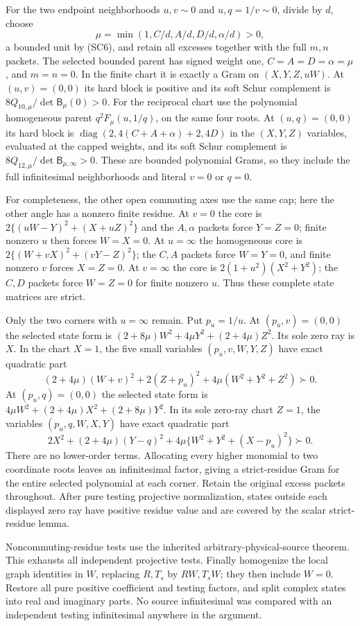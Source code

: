 For the two endpoint neighborhoods $u,v\sim0$ and
$u,q=1/v\sim0$, divide by $d$, choose
\[
 \mu=\min(1,C/d,A/d,D/d,\alpha/d)>0,
\]
a bounded unit by (SC6), and retain all excesses together with
the full $m,n$ packets. The selected bounded parent has signed
weight one, $C=A=D=\alpha=\mu$, and $m=n=0$.
In the finite chart it is exactly a Gram on $(X,Y,Z,uW)$.
At $(u,v)=(0,0)$ its hard block is positive and its soft Schur
complement is $8Q_{10,\mu}/\det\mathsf B_\mu(0)>0$.
For the reciprocal chart use the polynomial homogeneous parent
$q^2F_\mu(u,1/q)$, on the same four roots. At $(u,q)=(0,0)$
its hard block is
$\operatorname{diag}(2,4(C+A+\alpha)+2,4D)$ in the
$(X,Y,Z)$ variables, evaluated at the capped weights, and its
soft Schur complement is
$8Q_{12,\mu}/\det\mathsf B_{\mu,\infty}>0$.
These are bounded polynomial Grams, so they include the full
infinitesimal neighborhoods and literal $v=0$ or $q=0$.

For completeness, the other open commuting axes use the same cap;
here the other angle has a nonzero finite residue.
At $v=0$ the core is $2\{(uW-Y)^2+(X+uZ)^2\}$ and the
$A,\alpha$ packets force $Y=Z=0$; finite nonzero $u$ then forces
$W=X=0$. At $u=\infty$ the homogeneous core is
$2\{(W+vX)^2+(vY-Z)^2\}$; the $C,A$ packets force $W=Y=0$,
and finite nonzero $v$ forces $X=Z=0$. At $v=\infty$ the core
is $2(1+u^2)(X^2+Y^2)$; the $C,D$ packets force $W=Z=0$
for finite nonzero $u$. Thus these complete state matrices are strict.

Only the two corners with $u=\infty$ remain. Put $p_u=1/u$.
At $(p_u,v)=(0,0)$ the selected state form is
$(2+8\mu)W^2+4\mu Y^2+(2+4\mu)Z^2$.
Its sole zero ray is $X$. In the chart $X=1$, the five small
variables $(p_u,v,W,Y,Z)$ have exact quadratic part
\[
 (2+4\mu)(W+v)^2+2(Z+p_u)^2+4\mu(W^2+Y^2+Z^2)\succ0.
\]
At $(p_u,q)=(0,0)$ the selected state form is
$4\mu W^2+(2+4\mu)X^2+(2+8\mu)Y^2$.
In its sole zero-ray chart $Z=1$, the variables
$(p_u,q,W,X,Y)$ have exact quadratic part
\[
 2X^2+(2+4\mu)(Y-q)^2+4\mu\{W^2+Y^2+(X-p_u)^2\}\succ0.
\]
There are no lower-order terms. Allocating every higher monomial
to two coordinate roots leaves an infinitesimal factor, giving a
strict-residue Gram for the entire selected polynomial at each
corner. Retain the original excess packets throughout.
After pure testing projective normalization, states outside each
displayed zero ray have positive residue value and are covered by
the scalar strict-residue lemma.

Noncommuting-residue tests use the inherited arbitrary-physical-source
theorem. This exhausts all independent projective tests. Finally
homogenize the local graph identities in $W$, replacing $R,T_s$
by $RW,T_sW$; they then include $W=0$. Restore all pure positive
coefficient and testing factors, and split complex states into real
and imaginary parts. No source infinitesimal was compared with an
independent testing infinitesimal anywhere in the argument.

